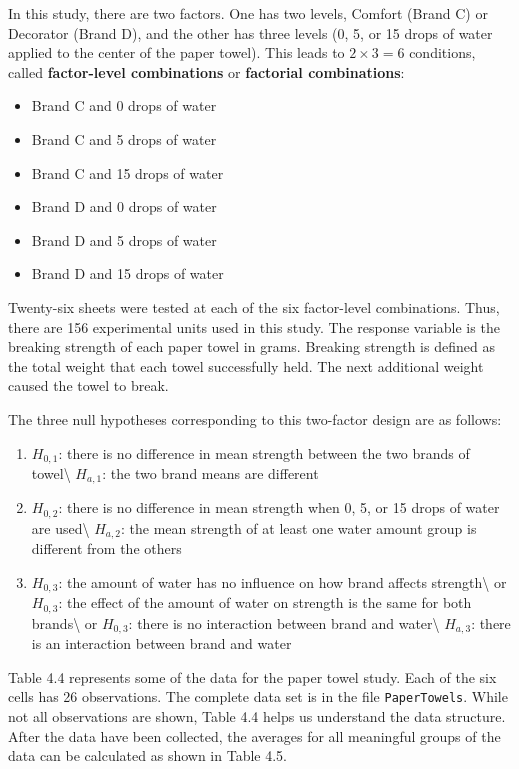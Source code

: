 \documentclass[
]{book}
\providecommand{\tightlist}{%
  \setlength{\itemsep}{0pt}\setlength{\parskip}{0pt}}
\begin{document}
In this study, there are two factors. One has two levels, Comfort (Brand C) or Decorator (Brand D), and the other has three levels (0, 5, or 15 drops of water applied to the center of the paper towel). This leads to \(2 \times 3 = 6\) conditions, called \textbf{factor-level combinations} or \textbf{factorial combinations}:

\begin{itemize}
\tightlist
\item
  Brand C and 0 drops of water
\item
  Brand C and 5 drops of water
\item
  Brand C and 15 drops of water
\item
  Brand D and 0 drops of water
\item
  Brand D and 5 drops of water
\item
  Brand D and 15 drops of water
\end{itemize}

Twenty-six sheets were tested at each of the six factor-level combinations. Thus, there are 156 experimental units used in this study. The response variable is the breaking strength of each paper towel in grams. Breaking strength is defined as the total weight that each towel successfully held. The next additional weight caused the towel to break.

The three null hypotheses corresponding to this two-factor design are as follows:

\begin{enumerate}
\def\labelenumi{\arabic{enumi}.}
\item
  \(H_{0,1}\): there is no difference in mean strength between the two brands of towel\textbackslash{}
  \(H_{a,1}\): the two brand means are different
\item
  \(H_{0,2}\): there is no difference in mean strength when 0, 5, or 15 drops of water are used\textbackslash{}
  \(H_{a,2}\): the mean strength of at least one water amount group is different from the others
\item
  \(H_{0,3}\): the amount of water has no influence on how brand affects strength\textbackslash{}
  or \(H_{0,3}\): the effect of the amount of water on strength is the same for both brands\textbackslash{}
  or \(H_{0,3}\): there is no interaction between brand and water\textbackslash{}
  \(H_{a,3}\): there is an interaction between brand and water
\end{enumerate}

Table 4.4 represents some of the data for the paper towel study. Each of the six cells has 26 observations. The complete data set is in the file \texttt{PaperTowels}. While not all observations are shown, Table 4.4 helps us understand the data structure. After the data have been collected, the averages for all meaningful groups of the data can be calculated as shown in Table 4.5.
\end{document}

